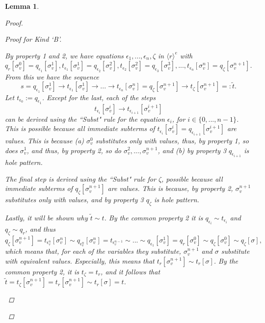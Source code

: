 \documentclass[11pt]{article} %
\newtheorem{lemma}{Lemma}
\begin{document}
\begin{lemma}
\begin{proof}
\begin{enumerate}
\begin{proof}[Proof for Kind `B']
\begin{itemize}
By property 1 and 2, we have equations $\epsilon_1, ..., \epsilon_n, \zeta$ in $\langle r \rangle^e$ with $q_r[\sigma^0_v] = q_{\epsilon_1}[\sigma^1_v], t_{\epsilon_1}[\sigma^1_v] = q_{\epsilon_2}[\sigma^2_v], t_{\epsilon_2}[\sigma^2_v] = q_{\epsilon_3}[\sigma^3_v], ..., t_{\epsilon_n}[\sigma^n_v] = q_\zeta[\sigma^{n+1}_v]$.
From this we have the sequence
\begin{equation*}
s = q_{\epsilon_1}[\sigma^1_v] \longrightarrow t_{\epsilon_1}[\sigma^1_v] \longrightarrow ... \longrightarrow t_{\epsilon_n}[\sigma^n_v] = q_\zeta[\sigma^{n+1}_v] \longrightarrow t_\zeta[\sigma^{n+1}_v] =: \widetilde{t}.
\end{equation*}
Let $t_{\epsilon_0} := q_{\epsilon_1}$. Except for the last, each of the steps
\begin{equation*}
t_{\epsilon_i}[\sigma^i_v] \longrightarrow t_{\epsilon_{i+1}}[\sigma^{i+1}_v]
\end{equation*}
can be derived using the ``Subst" rule for the equation $\epsilon_i$, for $i \in \{0, ..., n-1\}$. This is possible because all immediate subterms of $t_{\epsilon_i}[\sigma^i_v] = q_{\epsilon_{i+1}}[\sigma^{i+1}_v]$ are values. This is because (a) $\sigma^0_v$ substitutes only with values, thus, by property 1, so does $\sigma^1_v$, and thus, by property 2, so do $\sigma^2_v, ..., \sigma^{n+1}_v$, and (b) by property 3 $q_{\epsilon_{i+1}}$ is hole pattern.

The final step is derived using the ``Subst" rule for $\zeta$, possible because all immediate subterms of $q_\zeta[\sigma^{n+1}_v]$ are values. This is because, by property 2, $\sigma^{n+1}_v$ substitutes only with values, and by property 3 $q_\zeta$ is hole pattern.

Lastly, it will be shown why $\widetilde{t} \sim t$. By the common property 2 it is $q_{\epsilon_i} \sim t_{\epsilon_i}$ and $q_{\zeta} \sim q_r$, and thus
\begin{equation*}
q_{\zeta}[\sigma^{n+1}_v] = t_{\epsilon^n_v}[\sigma^n_v] \sim q_{\epsilon^n_v}[\sigma^n_v] = t_{\epsilon^{n-1}_v} \sim ... \sim q_{\epsilon_1}[\sigma^1_v] = q_r[\sigma^0_v] \sim q_{\zeta}[\sigma^0_v] \sim q_{\zeta}[\sigma],
\end{equation*}
which means that, for each of the variables they substitute, $\sigma^{n+1}_v$ and $\sigma$ substitute with equivalent values. Especially, this means that $t_r[\sigma^{n+1}_v] \sim t_r[\sigma]$. By the common property 2, it is $t_\zeta = t_r$, and it follows that $\widetilde{t} = t_\zeta[\sigma^{n+1}_v] = t_r[\sigma^{n+1}_v] \sim t_r[\sigma] = t$.


\end{itemize}
\end{proof}
\end{enumerate}
\end{proof}
\end{lemma}
\end{document}
